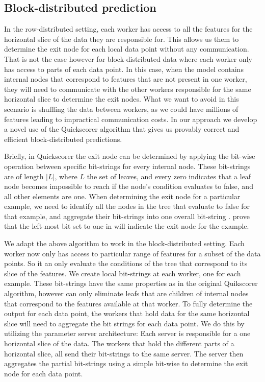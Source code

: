 \subsection{Block-distributed prediction}
\label{subsec:block-gbt-prediction}

In the row-distributed setting, each worker has access to all the features for the
horizontal slice of the data they are responsible for. This allows us them to determine
the exit node for each local data point without any communication.
That is not the case however
for block-distributed data where each worker only has access to parts of each data
point. In this case, when the model contains internal nodes that correspond to features
that are not present in one worker, they will need to communicate with the other
workers responsible for the same horizontal slice to determine the exit nodes.
What we want to avoid in this scenario is shuffling the data between workers,
as we could have millions of features leading to impractical communication
costs. In our approach we develop a novel use of the Quickscorer \cite{quickscorer} algorithm
that gives us provably correct and efficient block-distributed predictions.

Briefly, in Quickscorer the exit node can be determined by applying the bit-wise
\AND operation between specific bit-strings for every internal node.
These bit-strings are of length $|L|$, where $L$ the set of leaves, and
every zero indicates that a leaf node becomes impossible to reach if the node's
condition evaluates to false, and all other elements are one. When determining
the exit node for a particular example, we need to identify all the nodes in
the tree that evaluate to false for that example, and aggregate their bit-strings into one overall
bit-string \bitstring.
\citet{quickscorer}
prove that the left-most bit set to one in \bitstring will indicate the exit node for the example.

We adapt the above algorithm to work in the block-distributed setting. Each worker
now only has access to particular range of features for a subset of the data points.
So it an only evaluate the conditions of the tree that correspond to its slice
of the features. We create local bit-strings at each worker, one for each example.
These bit-strings have the same properties as in the original Quikscorer algorithm,
however can only eliminate leafs that are children of internal nodes that correspond
to the features available at that worker. To fully determine the output for each
data point, the workers that hold data for the same horizontal slice will need
to aggregate the bit strings for each data point. We do this by utilizing the
parameter server \cite{muPS} architecture: Each server is responsible for a
one horizontal slice of the data. The workers that hold the different parts of
a horizontal slice, all send their bit-strings to the same server.
The server then aggregates the partial bit-strings using a simple bit-wise \AND to determine the exit
node for each data point.


